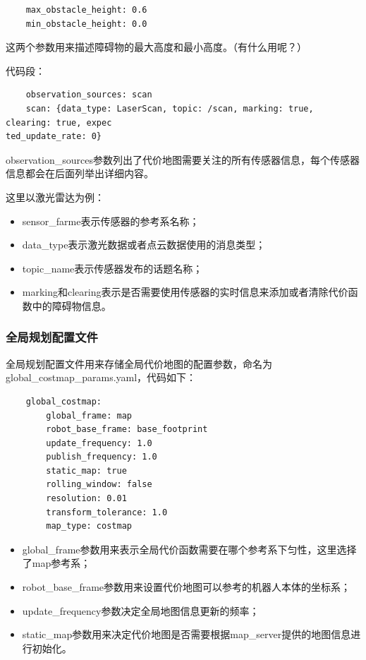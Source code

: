 \documentclass[9pt, oneside]{book}
\begin{document}
\begin{verbatim}
    max_obstacle_height: 0.6
    min_obstacle_height: 0.0
\end{verbatim}

这两个参数用来描述障碍物的最大高度和最小高度。（\textcolor[rgb]{1,0,0}{有什么用呢？}）

代码段：

\begin{verbatim}
    observation_sources: scan
    scan: {data_type: LaserScan, topic: /scan, marking: true, clearing: true, expec
ted_update_rate: 0}
\end{verbatim}

observation\_sources参数列出了代价地图需要关注的所有传感器信息，每个传感器信息都会在后面列举出详细内容。

这里以激光雷达为例：

\begin{itemize}
    \item sensor\_farme表示传感器的参考系名称；
    \item data\_type表示激光数据或者点云数据使用的消息类型；
    \item topic\_name表示传感器发布的话题名称；
    \item marking和clearing表示是否需要使用传感器的实时信息来添加或者清除代价函数中的障碍物信息。
\end{itemize}

\subsubsection{全局规划配置文件}

全局规划配置文件用来存储全局代价地图的配置参数，命名为global\_costmap\_params.yaml，代码如下：

\begin{verbatim}
    global_costmap:
        global_frame: map
        robot_base_frame: base_footprint
        update_frequency: 1.0
        publish_frequency: 1.0
        static_map: true
        rolling_window: false
        resolution: 0.01
        transform_tolerance: 1.0
        map_type: costmap
 \end{verbatim}

\begin{itemize}
    \item global\_frame参数用来表示全局代价函数需要在哪个参考系下匀性，这里选择了map参考系；
    \item robot\_base\_frame参数用来设置代价地图可以参考的机器人本体的坐标系；
    \item update\_frequency参数决定全局地图信息更新的频率；
    \item static\_map参数用来决定代价地图是否需要根据map\_server提供的地图信息进行初始化。
\end{itemize}
\end{document}
